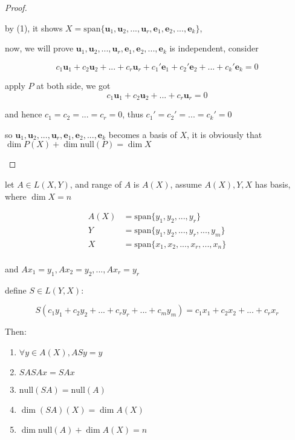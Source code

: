 \begin{proof}
\begin{enumerate}
        by (1), it shows $X = \mathrm{span} \{\mathbf{u}_1, \mathbf{u}_2,..., \mathbf{u}_r, \mathbf{e}_1, \mathbf{e}_2, ..., \mathbf{e}_k \}$, 

        now, we will prove $\mathbf{u}_1, \mathbf{u}_2,..., \mathbf{u}_r, \mathbf{e}_1, \mathbf{e}_2, ..., \mathbf{e}_k$ is independent, consider

        \[
            c_1\mathbf{u}_1 +  c_2\mathbf{u}_2 + ... + c_r \mathbf{u}_r + c_1'\mathbf{e}_1 + c_2'\mathbf{e}_2 + ...+ c_k' \mathbf{e}_k = 0
        \]

        apply $P$ at both side, we got
        \[
c_1\mathbf{u}_1 +  c_2\mathbf{u}_2 + ... + c_r \mathbf{u}_r = 0
        \]

        and hence $c_1 = c_2 = ... = c_r = 0$, thus $c_1' = c_2' = ... = c_k' = 0$

        so $\mathbf{u}_1, \mathbf{u}_2,..., \mathbf{u}_r, \mathbf{e}_1, \mathbf{e}_2, ..., \mathbf{e}_k$ becomes a
        basis of $X$, it is obviously that $\dim P(X) + \dim \mathrm{null}(P) = \dim X$

    \end{enumerate}

\end{proof}

\begin{thm}
    let $A \in L(X, Y)$, and range of $A$ is $A(X)$, assume $A(X), Y, X$ has basis, where $\dim X = n$

    \begin{align*}
        A(X) &= \mathrm{span}\{ y_1,y_2,...,y_r \} \\
        Y &= \mathrm{span}\{ y_1,y_2,...,y_r,...,y_m \} \\
        X &= \mathrm{span}\{ x_1,x_2,...,x_r,...,x_n \} \\
    \end{align*}

    and $Ax_1 = y_1, Ax_2 = y_2, ..., Ax_r = y_r$

    define $S \in L(Y, X)$:

    \[
        S(c_1y_1 + c_2y_2 + ... + c_ry_r + ... + c_m y_m ) = c_1x_1 + c_2x_2 + ... + c_rx_r
    \]

    Then:

    \begin{enumerate}
        \item $\forall y \in A(X), ASy = y$

        \item $SASAx = SAx$

        \item $\mathrm{null}(SA) = \mathrm{null}(A)$

        \item $\dim (SA)(X) = \dim A(X)$

        \item $\dim \mathrm{null}(A) + \dim A(X) = n$
    \end{enumerate}
\end{thm}

